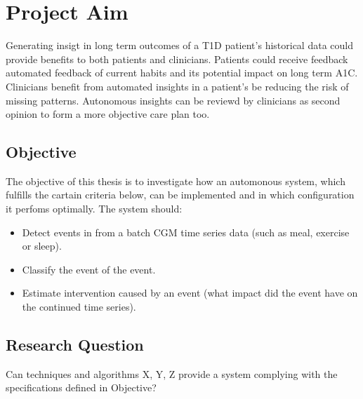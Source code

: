 \section{Project Aim}

Generating insigt in long term outcomes of a T1D patient's historical data could provide benefits to both patients and clinicians.
Patients could receive feedback automated feedback of current habits and its potential impact on long term A1C.
Clinicians benefit from automated insights in a patient's be reducing the risk of missing patterns.
Autonomous insights can be reviewd by clinicians as second opinion to form a more objective care plan too.

\subsection{Objective}

The objective of this thesis is to investigate how an automonous system, which fulfills the cartain criteria below, can be implemented and in which configuration it perfoms optimally. The system should:
\begin{itemize}
  \item Detect events in from a batch CGM time series data (such as meal, exercise or sleep).
  \item Classify the event of the event.
  \item Estimate intervention caused by an event (what impact did the event have on the continued time series).
\end{itemize}

\subsection{Research Question}

Can techniques and algorithms X, Y, Z provide a system complying with the specifications defined in Objective?

